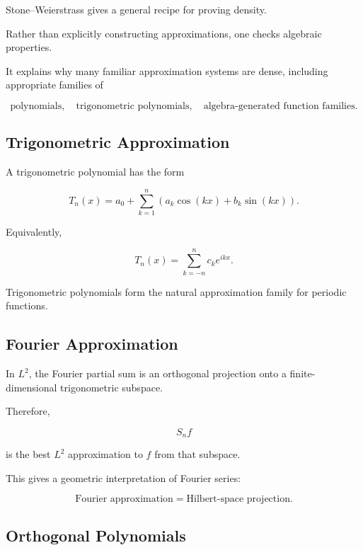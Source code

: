 Stone--Weierstrass gives a general recipe for proving density.

Rather than explicitly constructing approximations, one checks
algebraic properties.

It explains why many familiar approximation systems are dense, including
appropriate families of

\[
\boxed{
\text{polynomials},
\quad
\text{trigonometric polynomials},
\quad
\text{algebra-generated function families}.
}
\]

\subsection{Trigonometric Approximation}
\label{subsec:trigonometric-approximation}

A trigonometric polynomial has the form

\[
\boxed{
T_n(x)
=
a_0
+
\sum_{k=1}^{n}
\left(
a_k\cos(kx)
+
b_k\sin(kx)
\right).
}
\]

Equivalently,

\[
\boxed{
T_n(x)
=
\sum_{k=-n}^{n}
c_ke^{ikx}.
}
\]

Trigonometric polynomials form the natural approximation family for
periodic functions.

\subsection{Fourier Approximation}
\label{subsec:fourier-as-approximation}

In \(L^2\), the Fourier partial sum is an orthogonal projection onto a
finite-dimensional trigonometric subspace.

Therefore,

\[
\boxed{
S_nf
}
\]

is the best \(L^2\) approximation to \(f\) from that subspace.

This gives a geometric interpretation of Fourier series:

\[
\boxed{
\text{Fourier approximation}
=
\text{Hilbert-space projection}.
}
\]

\subsection{Orthogonal Polynomials}
\label{subsec:orthogonal-polynomials}

